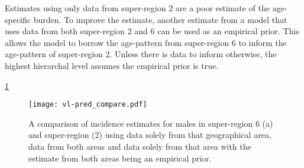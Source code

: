 Estimates using only data from super-region 2 are a poor estimate of the age-specific burden.  To improve the estimate, another estimate from a model that uses data from both super-region 2 and 6 can be used as an empirical prior.  This allows the model to borrow the age-pattern from super-region 6 to inform the age-pattern of super-region 2.  Unless there is data to inform otherwise, the highest hierarchal level assumes the empirical prior is true.

\ref{fig:app-vl pred compare}

    \begin{figure}[h]
        \begin{center}
            \texttt{[image: vl-pred\_compare.pdf]}
            \caption{A comparison of incidence estimates for males in super-region 6 (a) and super-region (2) using data solely from that geographical area, data from both areas and data solely from that area with the estimate from both areas being an empirical prior.}
            \label{fig:app-vl pred compare}
        \end{center}
    \end{figure} 